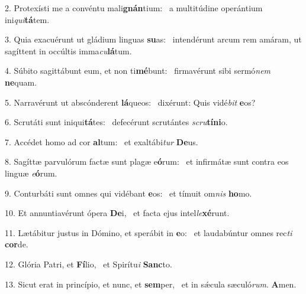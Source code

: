 2. Protexísti me a convéntu mali\textbf{gnán}tium: \ast\  a multitúdine operántium ini\textit{qui}\textbf{tá}tem.\

3. Quia exacuérunt ut gládium linguas \textbf{su}as: \ast\  intendérunt arcum rem amáram, ut sagíttent in occúltis imma\textit{cu}\textbf{lá}tum.\

4. Súbito sagittábunt eum, et non ti\textbf{mé}bunt: \ast\  firmavérunt sibi sermó\textit{nem} \textbf{ne}quam.\

5. Narravérunt ut abscónderent \textbf{lá}queos: \ast\  dixérunt: Quis vidé\textit{bit} \textbf{e}os?\

6. Scrutáti sunt iniqui\textbf{tá}tes: \ast\  defecérunt scrutántes \textit{scru}\textbf{tí}\textbf{ni}o.\

7. Accédet homo ad cor \textbf{al}tum: \ast\  et exaltábi\textit{tur} \textbf{De}us.\

8. Sagíttæ parvulórum factæ sunt plagæ e\textbf{ó}rum: \ast\  et infirmátæ sunt contra eos linguæ \textit{e}\textbf{ó}rum.\

9. Conturbáti sunt omnes qui vidébant \textbf{e}os: \ast\  et tímuit om\textit{nis} \textbf{ho}mo.\

10. Et annuntiavérunt ópera \textbf{De}i, \ast\  et facta ejus intel\textit{le}\textbf{xé}runt.\

11. Lætábitur justus in Dómino, et sperábit in \textbf{e}o: \ast\  et laudabúntur omnes rec\textit{ti} \textbf{cor}de.\

12. Glória Patri, et \textbf{Fí}lio, \ast\  et Spirítu\textit{i} \textbf{Sanc}to.\

13. Sicut erat in princípio, et nunc, et \textbf{sem}per, \ast\  et in sǽcula sæculó\textit{rum}. \textbf{A}men.\

